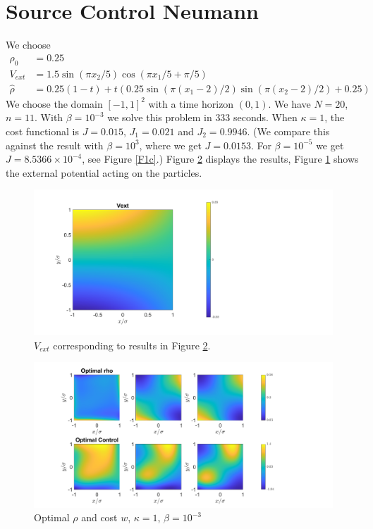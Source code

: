 \documentclass[11pt, a4paper]{article}
\theoremstyle{definition}
\newcommand{\hr}{\widehat \rho}
\begin{document}
	\section*{Source Control Neumann}
	We choose 
	\begin{align*}
		\rho_0 &= 0.25\\
		V_{ext} &= 1.5\sin(\pi x_2/5)\cos(\pi x_1/5 + \pi/5)\\
		\hr &= 0.25(1 - t) + t(0.25\sin(\pi(x_1 - 2)/2)\sin(\pi(x_2 - 2)/2) + 0.25)
	\end{align*}
	We choose the domain $[-1,1]^2$ with a time horizon $(0,1)$. We have $N = 20$, $n = 11$. 
	With $\beta = 10^{-3}$ we solve this problem in $333$ seconds. When $\kappa = 1$, the cost functional is $J = 0.015$, $J_1 = 0.021$ and $J_2 = 0.9946$. (We compare this against the result with $\beta = 10^3$, where we get $J = 0.0153$. For $\beta = 10^{-5}$ we get $J = 8.5366 \times 10^{-4}$, see Figure \ref{F1c}.)
	Figure \ref{F1} displays the results, Figure \ref{F1a} shows the external potential acting on the particles.
	\begin{figure}[h]
		\centering
		\includegraphics[scale=0.35]{Vext.png}
		\caption{$V_{ext}$ corresponding to results in Figure \ref{F1}.} 
		\label{F1a}
	\end{figure}
	\begin{figure}[h]
		\centering
		\includegraphics[scale=0.35]{SCEx1k1.png}
		\caption{Optimal $\rho$ and cost $w$, $\kappa = 1$, $\beta = 10^{-3}$} 
		\label{F1}
	\end{figure}
	
\end{document}
